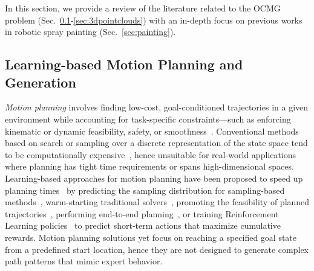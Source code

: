In this section, we provide a review of the literature related to the OCMG problem (Sec.~\ref{sec:motion_plan_gen}-\ref{sec:3dpointclouds}) with an in-depth focus on previous works in robotic spray painting (Sec.~\ref{sec:painting}). 

\subsection{Learning-based Motion Planning and Generation}
\label{sec:motion_plan_gen}
\emph{Motion planning} involves finding low-cost, goal-conditioned trajectories in a given environment while accounting for task-specific constraints---such as enforcing kinematic or dynamic feasibility, safety, or smoothness~\cite{karur2021surveypathplanning}.
%
Conventional methods based on search or sampling over a discrete representation of the state space tend to be computationally expensive~\cite{kicki2023fasttateo,ichnowski2020deepmotionplanning}, hence unsuitable for real-world applications where planning has tight time requirements or spans high-dimensional spaces. 
%
Learning-based approaches for motion planning have been proposed to speed up planning times~\cite{surveylearningrobotmotionplanning2021} by predicting the sampling distribution for sampling-based methods~\cite{wang2020neuralrrt,cheng2020learningpathplanning}, warm-starting traditional solvers~\cite{ichnowski2020deepmotionplanning}, promoting the feasibility of planned trajectories~\cite{kicki2023fasttateo}, performing end-to-end planning~\cite{pfeiffer2017perception,bency2019neuraloraclenet}, or training Reinforcement Learning policies~\cite{tsounis2020deepgaitrl,kim2020motion} to predict short-term actions that maximize cumulative rewards.
%
Motion planning solutions yet focus on reaching a specified goal state from a predefined start location, hence they are not designed to generate complex path patterns that mimic expert behavior. 

